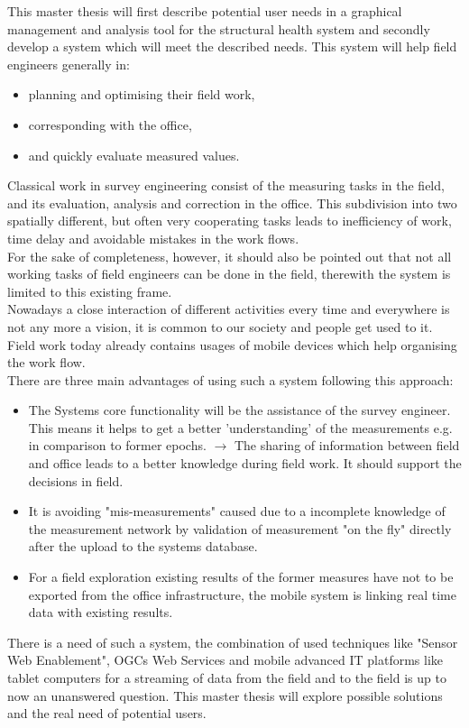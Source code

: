 This master thesis will first describe potential user needs in a graphical management and analysis tool for the structural health system and secondly develop a system which will meet the described needs. This system will help field engineers generally in:
\begin{itemize}
\item planning and optimising their field work,
\item corresponding with the office,
\item and quickly evaluate measured values.
\end{itemize}
Classical work in survey engineering consist of the measuring tasks in the field, and its evaluation, analysis and correction in the office. This subdivision into two spatially different, but often very cooperating tasks leads to inefficiency of work, time delay and avoidable mistakes in the work flows.\\
For the sake of completeness, however, it should also be pointed out that not all working tasks of field engineers can be done in the field, therewith the system is limited to this existing frame.\\
Nowadays a close interaction of different activities every time and everywhere is not any more a vision, it is common to our society and people get used to it. Field work today already contains usages of mobile devices which help organising the work flow.\\
There are three main advantages of using such a system following this approach:
\begin{itemize}
\item The Systems core functionality will be the assistance of the survey engineer. This means it helps to get a better 'understanding' of the measurements e.g. in comparison to former epochs. $\rightarrow$ The sharing of information between field and office leads to a better knowledge during field work. It should support the decisions in field.
\item It is avoiding "mis-measurements" caused due to a incomplete knowledge of the measurement network by validation of measurement "on the fly" directly after the upload to the systems database.
\item For a field exploration existing results of the former measures have not to be exported from the office infrastructure, the mobile system is linking real time data with existing results.
\end{itemize}
There is a need of such a system, the combination of used techniques like "Sensor Web Enablement", OGCs Web Services and mobile advanced IT platforms like tablet computers for a streaming of data from the field and to the field is up to now an unanswered question. This master thesis will explore possible solutions and the real need of potential users.\\
